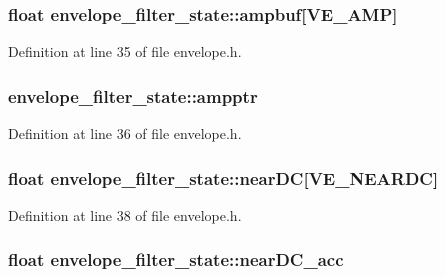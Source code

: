\subsubsection[{\texorpdfstring{ampbuf}{ampbuf}}]{\setlength{\rightskip}{0pt plus 5cm}float envelope\+\_\+filter\+\_\+state\+::ampbuf\mbox{[}{\bf V\+E\+\_\+\+A\+MP}\mbox{]}}\hypertarget{structenvelope__filter__state_a4bf3a0979f375ef318ec15477ac4d982}{}\label{structenvelope__filter__state_a4bf3a0979f375ef318ec15477ac4d982}


Definition at line 35 of file envelope.\+h.

\subsubsection[{\texorpdfstring{ampptr}{ampptr}}]{ envelope\+\_\+filter\+\_\+state\+::ampptr}\hypertarget{structenvelope__filter__state_accc7e4241fa4ad6220aaa1649ebc4f89}{}\label{structenvelope__filter__state_accc7e4241fa4ad6220aaa1649ebc4f89}


Definition at line 36 of file envelope.\+h.

\subsubsection[{\texorpdfstring{near\+DC}{nearDC}}]{\setlength{\rightskip}{0pt plus 5cm}float envelope\+\_\+filter\+\_\+state\+::near\+DC\mbox{[}{\bf V\+E\+\_\+\+N\+E\+A\+R\+DC}\mbox{]}}\hypertarget{structenvelope__filter__state_a58e86653a9251bbd8fb5bd2e6f0425c7}{}\label{structenvelope__filter__state_a58e86653a9251bbd8fb5bd2e6f0425c7}


Definition at line 38 of file envelope.\+h.

\subsubsection[{\texorpdfstring{near\+D\+C\+\_\+acc}{nearDC_acc}}]{\setlength{\rightskip}{0pt plus 5cm}float envelope\+\_\+filter\+\_\+state\+::near\+D\+C\+\_\+acc}\hypertarget{structenvelope__filter__state_ab8f2411712c79252e710896dc9ef4cb8}{}\label{structenvelope__filter__state_ab8f2411712c79252e710896dc9ef4cb8}


